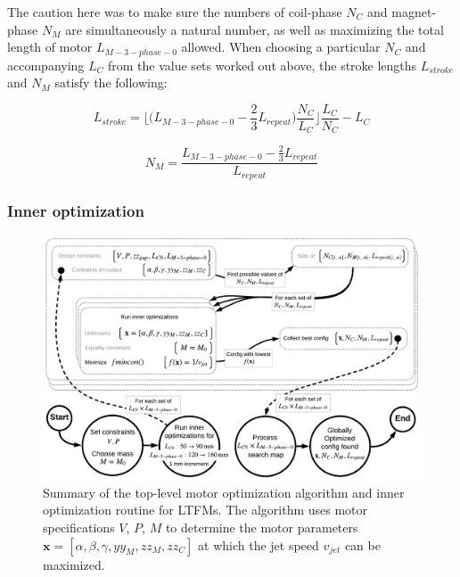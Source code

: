                 
                The caution here was to make sure the numbers of coil-phase $N_C$ and magnet-phase $N_M$ are simultaneously a natural number, as well as maximizing the total length of motor $L_{M-3-phase-0}$ allowed. When choosing a particular $N_C$ and accompanying $L_C$ from the value sets worked out above, the stroke lengths $L_{stroke}$ and $N_M$ satisfy the following:
    
                
                \begin{equation}
                    L_{stroke} = \Bigg\lfloor \bigg(L_{M-3-phase-0}-\frac{2}{3} L_{repeat}\bigg) \frac{ N_C}{L_C} \Bigg\rfloor \frac{L_C}{N_C}-L_C
                    \label{eq:chap/rsm/LTFM/L_stroke_2}
                \end{equation}
                
                
                \begin{equation}
                    N_M = \frac{L_{M-3-phase-0}-\frac{2}{3} L_{repeat}}{L_{repeat}}
                    \label{eq:chap/rsm/LTFM/N_M}
                \end{equation}


            \subsubsection{Inner optimization}         \label{Chapter:RSM/LTFM/Optimization/Inner}
            
                \begin{figure}[h]
                  \centering
                  \includegraphics[width=5.9in]{chap4/images3/RSM_LTFM_optimization.pdf}
                  \caption{Summary of the top-level motor optimization algorithm and inner optimization routine for \acsp{LTFM}. The algorithm uses motor specifications $V$, $P$, $M$ to determine the motor parameters $\textbf{x}=[\alpha,\beta,\gamma,yy_M,zz_M,zz_C]$ at which the jet speed $v_{jet}$ can be maximized.}
                  \label{fig:chapter/rsm/LTFM/top level optmization}
                \end{figure}
    
